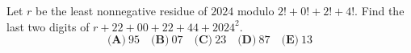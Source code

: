 Let $r$ be the least nonnegative residue of $2024$ modulo $2!+0!+2!+4!$. Find the last two digits of $r+22+00+22+44+2024^2$.
\[\textbf{(A)}~95\quad\textbf{(B)}~07\quad\textbf{(C)}~23\quad\textbf{(D)}~87\quad\textbf{(E)}~13\]
